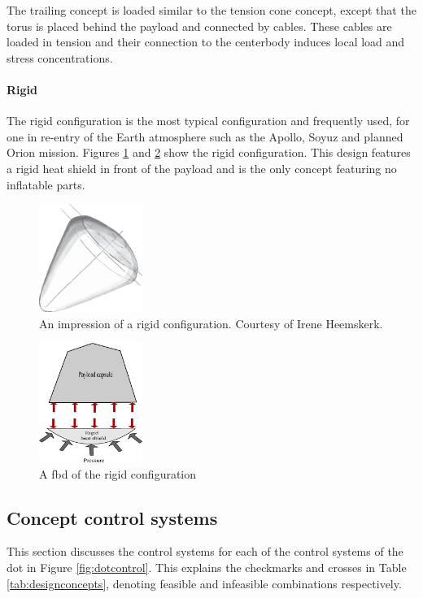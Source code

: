 The trailing concept is loaded similar to the tension cone concept, except that the torus is placed behind the payload and connected by cables. These cables are loaded in tension and their connection to the centerbody induces local load and stress concentrations.

\paragraph{Rigid}

The rigid configuration is the most typical configuration and frequently used, for one in re-entry of the Earth atmosphere such as the Apollo, Soyuz and planned Orion mission. Figures \ref{fig:conc_rigid} and \ref{fig:fbd_rigid} show the rigid configuration. This design features a rigid heat shield in front of the payload and is the only concept featuring no inflatable parts.

\begin{figure}[H]
\centering

\includegraphics[angle=180, width = 0.3\textwidth]{Figure/rigid.eps}
\caption{An impression of a rigid configuration. Courtesy of Irene Heemskerk.}

\label{fig:conc_rigid}
\end{figure}

\begin{figure}[H]
\centering
\includegraphics[width = 0.3\textwidth]{Figure/FBD_rigid.eps}
\caption{A \gls{fbd} of the rigid configuration}
\label{fig:fbd_rigid}
\end{figure}

\subsection{Concept control systems} \label{sec:ccs}
This section discusses the control systems for each of the control systems of the \gls{dot} in Figure  \ref{fig:dotcontrol}. This explains the checkmarks and crosses in Table \ref{tab:designconcepts}, denoting feasible and infeasible combinations respectively.

